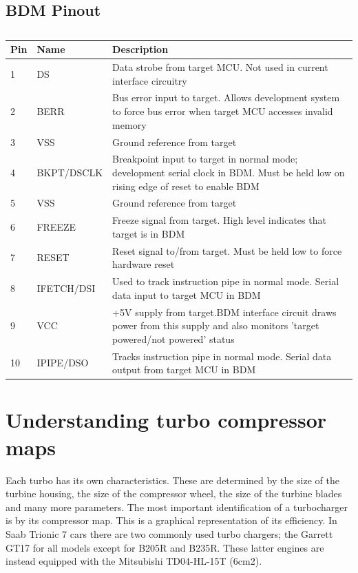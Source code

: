\documentclass[11pt,a4paper]{book}
\begin{document}
\section{BDM Pinout}
\begin{table}
    \centering
    \begin{tabular}{lll}
Pin &  Name &  Description  \\
\midrule
1 &DS & Data strobe from target MCU. Not used
in current interface circuitry \\
2 &BERR &
Bus error input to target. Allows
development system to force bus error
when target MCU accesses invalid
memory \\
3 &VSS & Ground reference from target \\
4 &BKPT/DSCLK &
Breakpoint input to target in normal
mode; development serial clock in
BDM. Must be held low on rising edge
of reset to enable BDM \\
5 &VSS & Ground reference from target \\
6 &FREEZE & Freeze signal from target. High level
indicates that target is in BDM \\
7 &RESET & Reset signal to/from target. Must be
held low to force hardware reset \\
8 &IFETCH/DSI &
Used to track instruction pipe in normal
mode. Serial data input to target MCU
in BDM \\
9 &VCC &
+5V supply from target.BDM interface
circuit draws power from this supply
and also monitors 'target powered/not
powered' status \\
10 &IPIPE/DSO &
Tracks instruction pipe in normal mode.
Serial data output from target MCU in
BDM
    \end{tabular}
    \caption{}
    \label{tab:}
\end{table}

\chapter{Understanding turbo compressor maps}
Each turbo has its own characteristics. These are determined by the size of the turbine housing, the
size of the compressor wheel, the size of the turbine blades and many more parameters.
The most important identification of a turbocharger is by its compressor map. This is a graphical
representation of its efficiency. In Saab Trionic 7 cars there are two commonly
used turbo chargers; the
Garrett GT17 for all models except for B205R and B235R. These latter engines are
instead equipped with the Mitsubishi TD04-HL-15T (6cm2).
\end{document}
